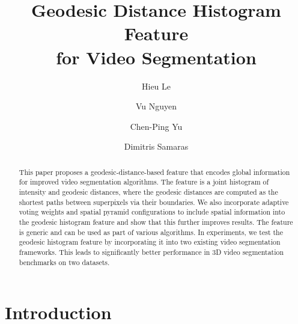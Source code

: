 \documentclass[runningheads]{llncs}
\begin{document}
\newcommand{\point}{
    \raise0.7ex\hbox{.}
    }


\pagestyle{headings}

\mainmatter

\title{Geodesic Distance Histogram Feature \\for Video Segmentation} %



\author{Hieu Le \and Vu Nguyen \and Chen-Ping Yu \and Dimitris Samaras} %

\maketitle

\begin{abstract}
This paper proposes a geodesic-distance-based feature that encodes global information for improved video segmentation algorithms. The feature is a joint histogram of intensity and geodesic distances, where the geodesic distances are computed as the shortest paths between superpixels via their boundaries. We also incorporate adaptive voting weights and spatial pyramid configurations to include spatial information into the geodesic histogram feature and show that this further improves results. The feature is generic and can be used as part of various algorithms. In experiments, we test the geodesic histogram feature by incorporating it into two existing video segmentation frameworks. This leads to significantly better performance in 3D video segmentation benchmarks on two datasets. 
\end{abstract}

\section{Introduction}
\label{sec:intro}
\end{document}
